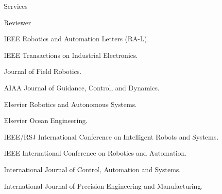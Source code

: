 \begin{rSection}{Services}
\begin{rSubsection}{Reviewer}{}{}{}
  \item IEEE Robotics and Automation Letters (RA-L).
  \item IEEE Transactions on Industrial Electronics.
  \item Journal of Field Robotics.
  \item AIAA Journal of Guidance, Control, and Dynamics.
  \item Elsevier Robotics and Autonomous Systems.
  \item Elsevier Ocean Engineering.
  \item IEEE/RSJ International Conference on Intelligent Robots and Systems.
  \item IEEE International Conference on Robotics and Automation.
  \item International Journal of Control, Automation and Systems.
  \item International Journal of Precision Engineering and Manufacturing.
\end{rSubsection}

\end{rSection}
